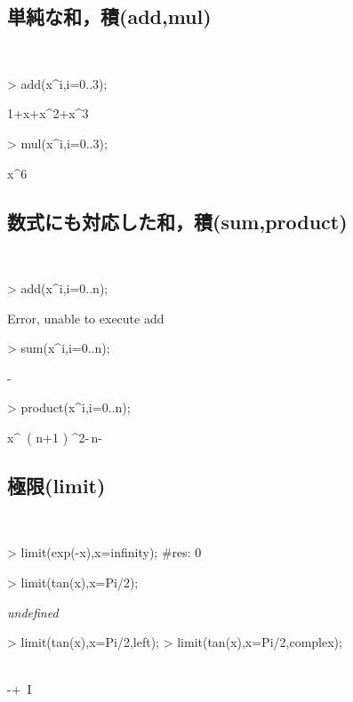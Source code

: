 \subsection{単純な和，積(add,mul)}　
\begin{MapleInput}
> add(x^i,i=0..3);
\end{MapleInput}
\begin{MapleOutput}
1+x+{x}^{2}+{x}^{3}
\end{MapleOutput}

\begin{MapleInput}
> mul(x^i,i=0..3);
\end{MapleInput}
\begin{MapleOutput}
{x}^{6}
\end{MapleOutput}

\subsection{数式にも対応した和，積(sum,product)}　
\begin{MapleInput}
> add(x^i,i=0..n);
\end{MapleInput}
\begin{MapleError}
Error, unable to execute add
\end{MapleError}
\begin{MapleInput}
> sum(x^i,i=0..n);
\end{MapleInput}
\begin{MapleOutput}
{}- 
\end{MapleOutput}

\begin{MapleInput}
> product(x^i,i=0..n);
\end{MapleInput}
\begin{MapleOutput}
{x}^{\, \left( n+1 \right) ^{2}-\,n-}
\end{MapleOutput}

\subsection{極限(limit)}　
\begin{MapleInput}
> limit(exp(-x),x=infinity); #res: 0
\end{MapleInput}

\begin{MapleInput}
> limit(tan(x),x=Pi/2);
\end{MapleInput}
\begin{MapleOutput}
{\it undefined}
\end{MapleOutput}

\begin{MapleInput}
> limit(tan(x),x=Pi/2,left); 
> limit(tan(x),x=Pi/2,complex);
\end{MapleInput}
\begin{MapleOutputGather}
\infty \notag \\
-\infty +\infty \, I\notag
\end{MapleOutputGather}


